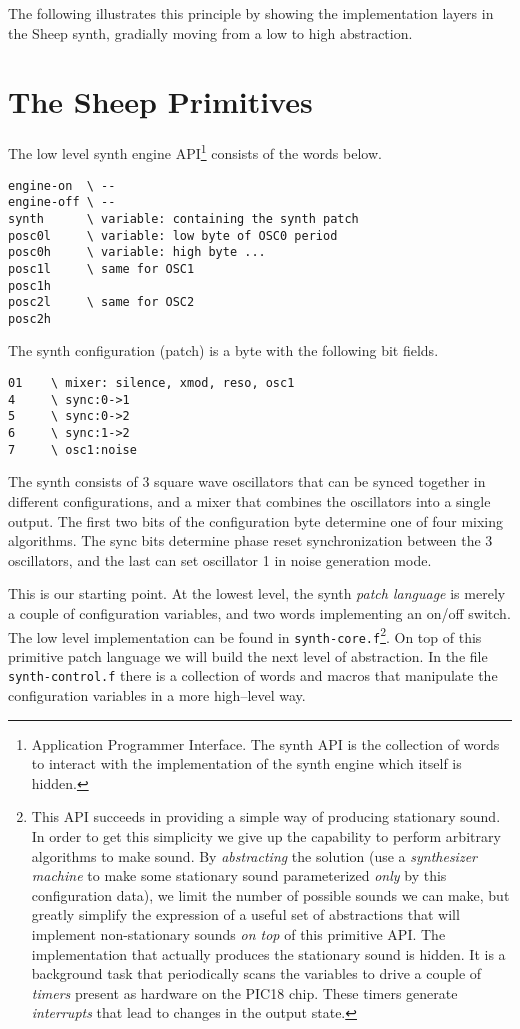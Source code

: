\documentclass[12pt]{article}
\begin{document}
The following illustrates this principle by showing the implementation
layers in the Sheep synth, gradially moving from a low to high
abstraction.

\section{The Sheep Primitives}

The low level synth engine API\footnote{Application Programmer
  Interface. The synth API is the collection of words to interact with
  the implementation of the synth engine which itself is hidden.}
consists of the words below.
\begin{samepage}
\begin{verbatim}
engine-on  \ --   
engine-off \ --
synth      \ variable: containing the synth patch
posc0l     \ variable: low byte of OSC0 period
posc0h     \ variable: high byte ...
posc1l     \ same for OSC1
posc1h
posc2l     \ same for OSC2
posc2h
\end{verbatim}
\end{samepage}
The synth configuration (patch) is a byte with the following bit
fields.
\begin{samepage}
\begin{verbatim}
01    \ mixer: silence, xmod, reso, osc1
4     \ sync:0->1
5     \ sync:0->2
6     \ sync:1->2
7     \ osc1:noise
\end{verbatim}
\end{samepage}
The synth consists of 3 square wave oscillators that can be synced
together in different configurations, and a mixer that combines the
oscillators into a single output. The first two bits of the
configuration byte determine one of four mixing algorithms. The sync
bits determine phase reset synchronization between the 3 oscillators,
and the last can set oscillator 1 in noise generation mode.

This is our starting point. At the lowest level, the synth \emph{patch
  language} is merely a couple of configuration variables, and two
words implementing an on/off switch.  The low level implementation can
be found in \verb|synth-core.f|\footnote{This API succeeds in
  providing a simple way of producing stationary sound. In order to
  get this simplicity we give up the capability to perform arbitrary
  algorithms to make sound. By \emph{abstracting} the solution (use a
  \emph{synthesizer machine} to make some stationary sound
  parameterized \emph{only} by this configuration data), we limit the
  number of possible sounds we can make, but greatly simplify the
  expression of a useful set of abstractions that will implement
  non-stationary sounds \emph{on top} of this primitive API. The
  implementation that actually produces the stationary sound is
  hidden. It is a background task that periodically scans the
  variables to drive a couple of \emph{timers} present as hardware on
  the PIC18 chip. These timers generate \emph{interrupts} that lead to
  changes in the output state.}. On top of this primitive patch
language we will build the next level of abstraction.  In the file
\verb|synth-control.f| there is a collection of words and macros that
manipulate the configuration variables in a more high--level way.
\end{document}
